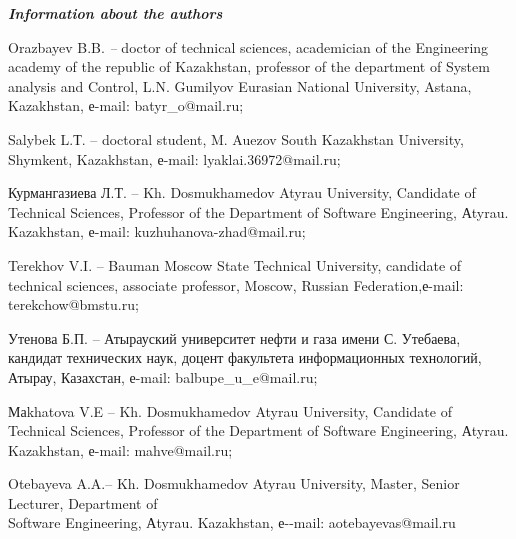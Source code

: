 \emph{{\bfseries Information about the authors}}
\begin{noparindent}

Orazbayev B.B. \emph{--} doctor of technical sciences, academician of
the Engineering academy of the republic of Kazakhstan, professor of the
department of System analysis and Control, L.N. Gumilyov Eurasian
National University, Astana, Kazakhstan, е-mail: batyr\_o@mail.ru;

Salybek L.Т. -- doctoral student, M. Auezov South Kazakhstan University,
Shymkent, Kazakhstan, е-mail: lyaklai.36972@mail.ru;

Курмангазиева Л.Т. -- Kh. Dosmukhamedov Atyrau University, Candidate of
Technical Sciences, Professor of the Department of Software Engineering,
Аtyrau. Kazakhstan, е-mail: kuzhuhanova-zhad@mail.ru;

Terekhov V.I. -- Bauman Moscow State Technical University, candidate of
technical sciences, associate professor, Moscow, Russian
Federation,е-mail: terekchow@bmstu.ru;

Утенова Б.П. -- Атырауский университет нефти и газа имени С. Утебаева,
кандидат технических наук, доцент факультета информационных технологий,
Атырау, Казахстан, е-mail: balbupe\_u\_e@mail.ru;

Маkhatova V.E -- Kh. Dosmukhamedov Atyrau University, Candidate of
Technical Sciences, Professor of the Department of Software Engineering,
Аtyrau. Kazakhstan, е-mail: mahve@mail.ru;

Otebayeva A.A.-- Kh. Dosmukhamedov Atyrau University, Master, Senior
Lecturer, Department of \\Software Engineering, Аtyrau. Kazakhstan,
е-\/-mail: aotebayevas@mail.ru
\end{noparindent}
